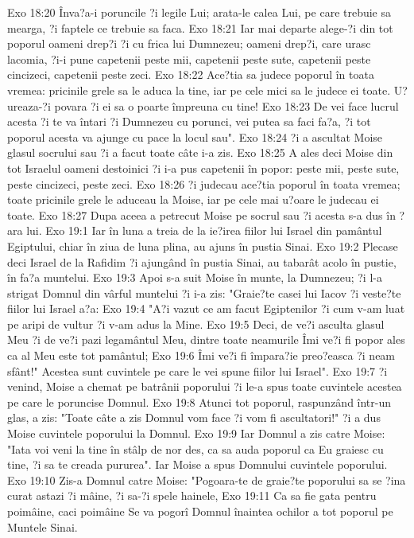 Exo 18:20  Înva?a-i poruncile ?i legile Lui; arata-le calea Lui, pe care trebuie sa mearga, ?i faptele ce trebuie sa faca.
Exo 18:21  Iar mai departe alege-?i din tot poporul oameni drep?i ?i cu frica lui Dumnezeu; oameni drep?i, care urasc lacomia, ?i-i pune capetenii peste mii, capetenii peste sute, capetenii peste cincizeci, capetenii peste zeci.
Exo 18:22  Ace?tia sa judece poporul în toata vremea: pricinile grele sa le aduca la tine, iar pe cele mici sa le judece ei toate. U?ureaza-?i povara ?i ei sa o poarte împreuna cu tine!
Exo 18:23  De vei face lucrul acesta ?i te va întari ?i Dumnezeu cu porunci, vei putea sa faci fa?a, ?i tot poporul acesta va ajunge cu pace la locul sau".
Exo 18:24  ?i a ascultat Moise glasul socrului sau ?i a facut toate câte i-a zis.
Exo 18:25  A ales deci Moise din tot Israelul oameni destoinici ?i i-a pus capetenii în popor: peste mii, peste sute, peste cincizeci, peste zeci.
Exo 18:26  ?i judecau ace?tia poporul în toata vremea; toate pricinile grele le aduceau la Moise, iar pe cele mai u?oare le judecau ei toate.
Exo 18:27  Dupa aceea a petrecut Moise pe socrul sau ?i acesta s-a dus în ?ara lui.
Exo 19:1  Iar în luna a treia de la ie?irea fiilor lui Israel din pamântul Egiptului, chiar în ziua de luna plina, au ajuns în pustia Sinai.
Exo 19:2  Plecase deci Israel de la Rafidim ?i ajungând în pustia Sinai, au tabarât acolo în pustie, în fa?a muntelui.
Exo 19:3  Apoi s-a suit Moise în munte, la Dumnezeu; ?i l-a strigat Domnul din vârful muntelui ?i i-a zis: "Graie?te casei lui Iacov ?i veste?te fiilor lui Israel a?a:
Exo 19:4  "A?i vazut ce am facut Egiptenilor ?i cum v-am luat pe aripi de vultur ?i v-am adus la Mine.
Exo 19:5  Deci, de ve?i asculta glasul Meu ?i de ve?i pazi legamântul Meu, dintre toate neamurile Îmi ve?i fi popor ales ca al Meu este tot pamântul;
Exo 19:6  Îmi ve?i fi împara?ie preo?easca ?i neam sfânt!" Acestea sunt cuvintele pe care le vei spune fiilor lui Israel".
Exo 19:7  ?i venind, Moise a chemat pe batrânii poporului ?i le-a spus toate cuvintele acestea pe care le poruncise Domnul.
Exo 19:8  Atunci tot poporul, raspunzând într-un glas, a zis: "Toate câte a zis Domnul vom face ?i vom fi ascultatori!" ?i a dus Moise cuvintele poporului la Domnul.
Exo 19:9  Iar Domnul a zis catre Moise: "Iata voi veni la tine în stâlp de nor des, ca sa auda poporul ca Eu graiesc cu tine, ?i sa te creada pururea". Iar Moise a spus Domnului cuvintele poporului.
Exo 19:10  Zis-a Domnul catre Moise: "Pogoara-te de graie?te poporului sa se ?ina curat astazi ?i mâine, ?i sa-?i spele hainele,
Exo 19:11  Ca sa fie gata pentru poimâine, caci poimâine Se va pogorî Domnul înaintea ochilor a tot poporul pe Muntele Sinai.
